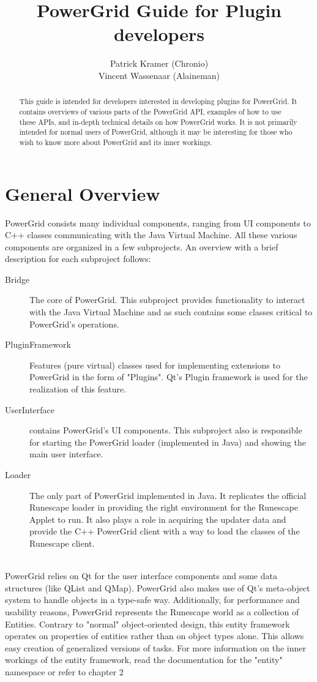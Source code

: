 \documentclass[]{article}
\title{PowerGrid Guide for Plugin developers}
\author{Patrick Kramer (Chronio)\\Vincent Wassenaar (Alaineman)}
\begin{document}
\maketitle

\begin{abstract}
This guide is intended for developers interested in developing plugins for PowerGrid. It contains overviews of various parts of the PowerGrid API, examples of how to use these APIs, and in-depth technical details on how PowerGrid works. It is not primarily intended for normal users of PowerGrid, although it may be interesting for those who wish to know more about PowerGrid and its inner workings.
\end{abstract}

\section{General Overview}
	PowerGrid consists many individual components, ranging from UI components to C++ classes communicating with the Java Virtual Machine. All these various components are organized in a few subprojects. An overview with a brief description for each subproject follows:
	\begin{description}
		\item[Bridge] The core of PowerGrid. This subproject provides functionality to interact with the Java Virtual Machine and as such contains some classes critical to PowerGrid's operations.
		\item[PluginFramework] Features (pure virtual) classes used for implementing extensions to PowerGrid in the form of "Plugins". Qt's Plugin framework is used for the realization of this feature.
		\item[UserInterface] contains PowerGrid's UI components. This subproject also is responsible for starting the PowerGrid loader (implemented in Java) and showing the main user interface.
		\item[Loader] The only part of PowerGrid implemented in Java. It replicates the official Runescape loader in providing the right environment for the Runescape Applet to run. It also plays a role in acquiring the updater data and provide the C++ PowerGrid client with a way to load the classes of the Runescape client.
	\end{description}
	\mbox{}\\ %
	PowerGrid relies on Qt for the user interface components and some data structures (like QList and QMap). PowerGrid also makes use of Qt's meta-object system to handle objects in a type-safe way. Additionally, for performance and usability reasons, PowerGrid represents the Runescape world as a collection of Entities. Contrary to "normal" object-oriented design, this entity framework operates on properties of entities rather than on object types alone. This allows easy creation of generalized versions of tasks. For more information on the inner workings of the entity framework, read the documentation for the "entity" namespace or refer to chapter 2 
	
\end{document}
